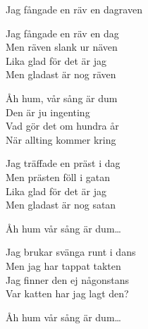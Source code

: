 \begin{song}{Jag fångade en räv en dag}{raven}
\begin{vers}
Jag fångade en räv en dag\\
Men räven slank ur näven\\
Lika glad för det är jag\\
Men gladast är nog räven\\
\end{vers}
\begin{vers}
  Åh hum, vår sång är dum\\
  Den är ju ingenting\\
  Vad gör det om hundra år\\
  När allting kommer kring\\
\end{vers}
\begin{vers}
Jag träffade en präst i dag\\
Men prästen föll i gatan\\
Lika glad för det är jag\\
Men gladast är nog satan\\
\end{vers}
\begin{vers}
  Åh hum vår sång är dum\ldots\\
\end{vers}
\begin{vers}
Jag brukar svänga runt i dans\\
Men jag har tappat takten\\
Jag finner den ej någonstans\\
Var katten har jag lagt den?\\
\end{vers}
\begin{vers}
  Åh hum vår sång är dum\ldots\\
\end{vers}
\end{song}
